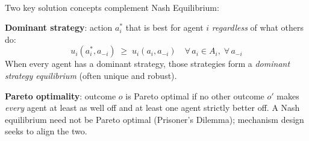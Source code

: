 \begin{tcbitemize}[ skin=sectionraster ]
    \tcbitem[title={Dominant Strategies \& Pareto Optimality}, raster multicolumn=6]
    Two key solution concepts complement Nash Equilibrium:\textsuperscript{\cite[][p.~64]{shohamMultiagentSystemsAlgorithmic2009}}

    \textbf{Dominant strategy}: action $a_i^*$ that is best for agent $i$ \emph{regardless}
    of what others do:
    \begin{equation}
        u_i(a_i^*, a_{-i}) \;\geq\; u_i(a_i, a_{-i})
        \quad \forall\, a_i \in A_i,\; \forall\, a_{-i}
    \end{equation}
    When every agent has a dominant strategy, those strategies form a
    \emph{dominant strategy equilibrium} (often unique and robust).

    \textbf{Pareto optimality}: outcome $o$ is Pareto optimal if no other outcome
    $o'$ makes \emph{every} agent at least as well off and at least one agent
    strictly better off.
    A Nash equilibrium need not be Pareto optimal (Prisoner's Dilemma);
    mechanism design seeks to align the two.

\end{tcbitemize}

